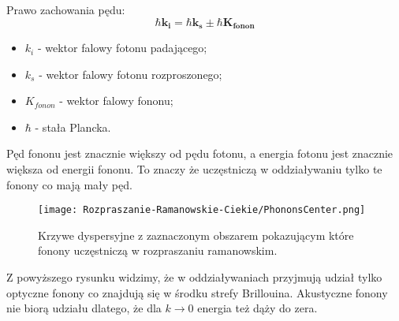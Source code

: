 Prawo zachowania pędu:
\begin{equation}
	\hbar \mathbf{k_{i}} = \hbar \mathbf{k_{s}} \pm \hbar \mathbf{K_{fonon}}
\end{equation}
\begin{itemize}	
	\item $k_{i}$ - wektor falowy fotonu padającego;
	\item $k_{s}$ - wektor falowy fotonu rozproszonego;
	\item $K_{fonon}$ - wektor falowy fononu;
	\item $\hbar$ - stała Plancka.
\end{itemize}

Pęd fononu jest znacznie większy od pędu fotonu, a energia fotonu jest 
znacznie większa od energii fononu. To znaczy że uczęstniczą w oddziaływaniu tylko te 
fonony co mają mały pęd.

\begin{figure}[H]
	\begin{center}
		\texttt{[image: Rozpraszanie-Ramanowskie-Ciekie/PhononsCenter.png]}
		\caption{Krzywe dyspersyjne z zaznaczonym obszarem pokazującym które fonony uczęstniczą w rozpraszaniu ramanowskim.}
	\end{center}
\end{figure}

Z powyższego rysunku widzimy, że w oddziaływaniach przyjmują udział tylko optyczne fonony co znajdują się w środku strefy Brillouina. Akustyczne fonony nie biorą udziału dlatego, że dla $k \rightarrow 0$ energia też dąży do zera.

